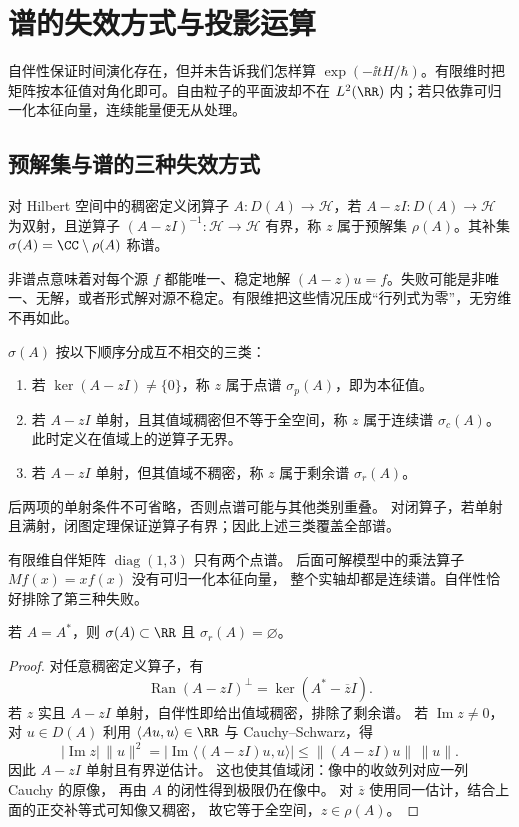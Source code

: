 \section{谱的失效方式与投影运算}
自伴性保证时间演化存在，但并未告诉我们怎样算 \(\exp(-\ii tH/\hbar)\)。有限维时把矩阵按本征值对角化即可。自由粒子的平面波却不在 \(L^2(\RR)\) 内；若只依靠可归一化本征向量，连续能量便无从处理。

\subsection{预解集与谱的三种失效方式}

\begin{definition}[预解集与谱]
对 Hilbert 空间中的稠密定义闭算子 \(A:D(A)\to\mathcal H\)，若 \(A-zI:D(A)\to\mathcal H\) 为双射，且逆算子 \((A-zI)^{-1}:\mathcal H\to\mathcal H\) 有界，称 \(z\) 属于预解集 \(\rho(A)\)。其补集 \(\sigma(A)=\CC\setminus\rho(A)\) 称谱。
\end{definition}

非谱点意味着对每个源 \(f\) 都能唯一、稳定地解 \((A-z)u=f\)。失败可能是非唯一、无解，或者形式解对源不稳定。有限维把这些情况压成“行列式为零”，无穷维不再如此。

\begin{definition}[点谱、连续谱与剩余谱]
\(\sigma(A)\) 按以下顺序分成互不相交的三类：
\begin{enumerate}
\item 若 \(\ker(A-zI)\ne\{0\}\)，称 \(z\) 属于点谱 \(\sigma_p(A)\)，即为本征值。
\item 若 \(A-zI\) 单射，且其值域稠密但不等于全空间，称 \(z\) 属于连续谱 \(\sigma_c(A)\)。此时定义在值域上的逆算子无界。
\item 若 \(A-zI\) 单射，但其值域不稠密，称 \(z\) 属于剩余谱 \(\sigma_r(A)\)。
\end{enumerate}
后两项的单射条件不可省略，否则点谱可能与其他类别重叠。
对闭算子，若单射且满射，闭图定理保证逆算子有界；因此上述三类覆盖全部谱。
\end{definition}

有限维自伴矩阵 $\operatorname{diag}(1,3)$ 只有两个点谱。
后面可解模型中的乘法算子 $Mf(x)=xf(x)$ 没有可归一化本征向量，
整个实轴却都是连续谱。自伴性恰好排除了第三种失败。

\begin{proposition}[自伴算子的实谱与剩余谱]
若 $A=A^*$，则 $\sigma(A)\subset\RR$ 且 $\sigma_r(A)=\varnothing$。
\end{proposition}
\begin{proof}
对任意稠密定义算子，有
\[
\operatorname{Ran}(A-zI)^\perp=\ker(A^*-\overline zI).
\]
若 $z$ 实且 $A-zI$ 单射，自伴性即给出值域稠密，排除了剩余谱。
若 $\operatorname{Im}z\ne0$，对 $u\in D(A)$ 利用
$\langle Au,u\rangle\in\RR$ 与 Cauchy--Schwarz，得
\[
|\operatorname{Im}z|\,\|u\|^2
=|\operatorname{Im}\langle(A-zI)u,u\rangle|
\le\|(A-zI)u\|\,\|u\|.
\]
因此 $A-zI$ 单射且有界逆估计。
这也使其值域闭：像中的收敛列对应一列 Cauchy 的原像，
再由 $A$ 的闭性得到极限仍在像中。
对 $\overline z$ 使用同一估计，结合上面的正交补等式可知像又稠密，
故它等于全空间，$z\in\rho(A)$。
\end{proof}

